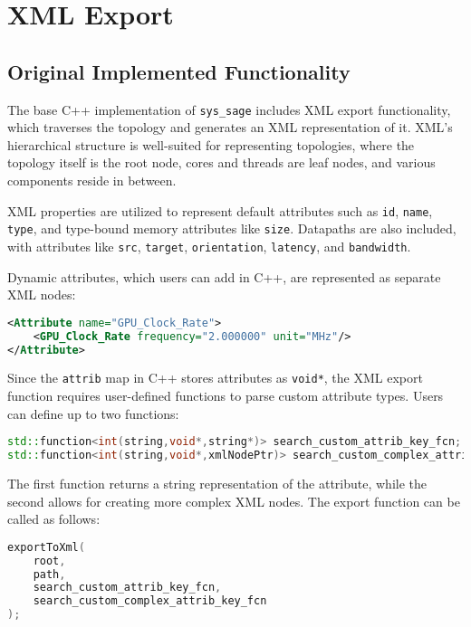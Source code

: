 \section{XML Export}

\subsection{Original Implemented Functionality}

The base C++ implementation of \verb|sys_sage| includes XML export functionality, which traverses the topology and generates an XML representation of it. XML's hierarchical structure is well-suited for representing topologies, where the topology itself is the root node, cores and threads are leaf nodes, and various components reside in between.

XML properties are utilized to represent default attributes such as \verb|id|, \verb|name|, \verb|type|, and type-bound memory attributes like \verb|size|. Datapaths are also included, with attributes like \verb|src|, \verb|target|, \verb|orientation|, \verb|latency|, and \verb|bandwidth|.

Dynamic attributes, which users can add in C++, are represented as separate XML nodes:

\begin{lstlisting}[language=xml, xleftmargin=4em, frame = single]
<Attribute name="GPU_Clock_Rate">
    <GPU_Clock_Rate frequency="2.000000" unit="MHz"/>
</Attribute>
\end{lstlisting}

Since the \verb|attrib| map in C++ stores attributes as \verb|void*|, the XML export function requires user-defined functions to parse custom attribute types. Users can define up to two functions:

\begin{lstlisting}[language=C++, xleftmargin=4em, frame = single]
std::function<int(string,void*,string*)> search_custom_attrib_key_fcn;
std::function<int(string,void*,xmlNodePtr)> search_custom_complex_attrib_key_fcn;
\end{lstlisting}

The first function returns a string representation of the attribute, while the second allows for creating more complex XML nodes. The export function can be called as follows:

\begin{lstlisting}[language=C++, xleftmargin=4em, frame = single]
exportToXml(
    root, 
    path, 
    search_custom_attrib_key_fcn, 
    search_custom_complex_attrib_key_fcn
);
\end{lstlisting}

